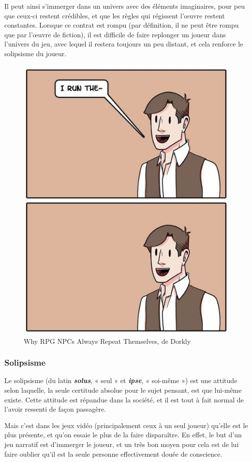 \documentclass[a4paper, 12pt]{article} %
\begin{document}
Il peut ainsi s’immerger dans un univers avec des éléments imaginaires, pour peu que ceux-ci restent crédibles, et que les règles qui régissent l’œuvre restent constantes.
Lorsque ce contrat est rompu (par définition, il ne peut être rompu que par l’œuvre de fiction), il est difficile de faire replonger un joueur dans l’univers du jeu, avec lequel il restera toujours un peu distant, et cela renforce le solipsisme du joueur.

\begin{figure}[!h]%
	\begin{center} 
		\includegraphics[width=0.40\columnwidth]{images/repeat3.png}%
		\caption{Why RPG NPCs Always Repeat Themselves, de Dorkly}%
	\end{center}
\end{figure}

\newpage
\subsubsection{Solipsisme}

Le solipsisme (du latin \textbf{\textit{solus}}, « seul » et \textbf{\textit{ipse}}, « soi-même ») est une attitude selon laquelle, la seule certitude absolue pour le sujet pensant, est que lui-même existe. Cette attitude est répandue dans la société, et il est tout à fait normal de l’avoir ressenti de façon passagère.

Mais c'est dans les jeux vidéo (principalement ceux à un seul joueur) qu'elle est le plus présente, et qu’on essaie le plus de la faire disparaître. En effet, le but d’un jeu narratif est d’immerger le joueur, et un très bon moyen pour cela est de lui faire oublier qu’il est la seule personne effectivement douée de conscience.
\end{document}
